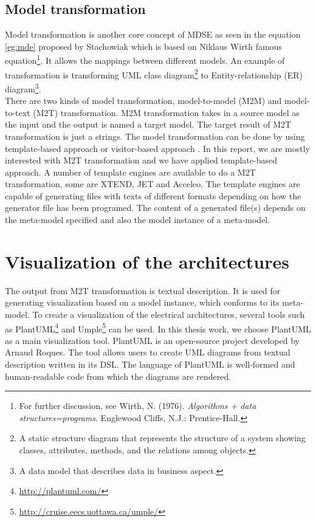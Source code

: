 \subsection{Model transformation}
Model transformation is another core concept of MDSE as seen in the equation \ref{eg:mde} proposed by Stachowiak which is based on Niklaus Wirth famous equation\footnote{For further discussion, see Wirth, N. (1976). \textit{Algorithms + data structures=programs}. Englewood Cliffs, N.J.: Prentice-Hall.}. It allows the mappings between different models. An example of transformation is transforming UML class diagram\footnote{A static structure diagram that represents the structure of a system showing classes, attributes, methods, and the relations among objects.} to Entity-relationship (ER) diagram\footnote{A data model that describes data in business aspect.}.\\

There are two kinds of model transformation, model-to-model (M2M) and model-to-text (M2T) transformation. M2M transformation takes in a source model as the input and the output is named a target model. The target result of M2T transformation is just a strings. The model transformation can be done by using  template-based approach or visitor-based approach \cite{Czarnecki}. In this report, we are mostly interested with M2T transformation and we have applied template-based approach. A number of template engines are available to do a M2T transformation, some are XTEND, JET and Acceleo. The template engines are capable of generating files with texts of different formats depending on how the generator file has been programed. The content of a generated file(s) depends on the meta-model specified and also the model instance of a meta-model.


\section{Visualization of the architectures}
The output from M2T transformation is textual description. It is used for generating visualization based on a model instance, which conforms to its meta-model. To create a visualization of the electrical architectures, several tools such as PlantUML\footnote{\url{http://plantuml.com/}} and Umple\footnote{\url{http://cruise.eecs.uottawa.ca/umple/}} can be used. In this thesis work, we choose PlantUML as a main visualization tool. PlantUML is an open-source project developed by Arnaud Roques. The tool allows users to create UML diagrams from textual description written in its DSL. The language of PlantUML is well-formed and human-readable code from which the diagrams are rendered.

